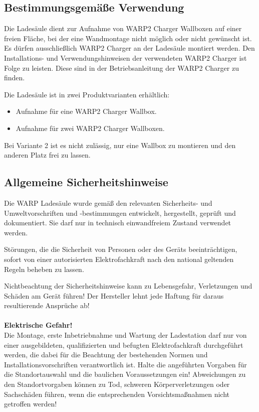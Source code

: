 \documentclass[a4paper,10pt]{article}
\newcommand{\warn}[1]{\begin{tcolorbox}[colback=boxred,colframe=red,coltext=
white,title=Warnung]#1\end{tcolorbox}}
\begin{document}
\begin{multicols*}{2}
	\subsection{Bestimmungsgemäße Verwendung}
	Die Ladesäule dient zur Aufnahme von WARP2 Charger Wallboxen auf einer freien
	Fläche, bei der eine Wandmontage nicht möglich oder nicht gewünscht ist. 
	Es dürfen ausschließlich WARP2 Charger
	an der Ladesäule montiert werden. Den Installations- und
	Verwendungshinweisen der verwendeten WARP2 Charger ist Folge zu leisten.
	Diese sind in der Betriebsanleitung der WARP2 Charger zu finden.

	Die Ladesäule ist in zwei Produktvarianten erhältlich:
	\begin{itemize}
		\item Aufnahme für eine WARP2 Charger Wallbox.
		\item Aufnahme für zwei WARP2 Charger Wallboxen.
	\end{itemize}

	Bei Variante 2 ist es nicht zulässig, nur eine Wallbox zu montieren und den anderen Platz frei zu lassen.
\vspace{-0.2cm}
	\subsection{Allgemeine Sicherheitshinweise}

	Die WARP Ladesäule wurde gemäß den relevanten Sicherheits- und Umweltvorschriften und -bestimmungen
	entwickelt, hergestellt, geprüft und dokumentiert. Sie darf nur in technisch einwandfreiem Zustand verwendet werden.

	Störungen, die die Sicherheit von Personen oder des Geräts beeinträchtigen,
	sofort von einer autorisierten Elektrofachkraft nach den national geltenden Regeln beheben zu lassen.

	\warn{Nichtbeachtung der Sicherheitshinweise kann zu Lebensgefahr,
	Verletzungen und Schäden am Gerät führen! Der Hersteller lehnt jede Haftung
	für daraus resultierende Ansprüche ab!
	\\
	\\
	\textbf{Elektrische Gefahr!}\\
	Die Montage, erste Inbetriebnahme und Wartung der Ladestation darf nur von
	einer ausgebildeten, qualifizierten und befugten Elektrofachkraft
	durchgeführt werden, die dabei für die Beachtung der bestehenden Normen und
	Installationsvorschriften verantwortlich ist. Halte die angeführten Vorgaben 
	für die Standortauswahl und die baulichen Voraussetzungen ein! Abweichungen 
	zu den Standortvorgaben können zu Tod, schweren Körperverletzungen oder 
	Sachschäden führen, wenn die entsprechenden Vorsichtsmaßnahmen nicht 
	getroffen werden!
	}


\end{multicols*}
\end{document}
